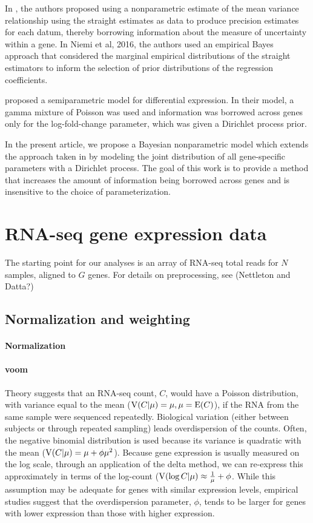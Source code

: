 In \citet{voom}, the authors proposed using a nonparametric estimate of the mean variance relationship using the straight estimates as data to produce precision estimates for each datum, thereby borrowing information about the measure of uncertainty within a gene. In Niemi et al, 2016, the authors used an empirical Bayes approach that considered the marginal empirical distributions of the straight estimators to inform the selection of prior distributions of the regression coefficients.

\citet{liu} proposed a semiparametric model for differential expression. In their model, a gamma mixture of Poisson was used and information was borrowed across genes only for the log-fold-change parameter, which was given a Dirichlet process prior.

In the present article, we propose a Bayesian nonparametric model which extends the approach taken in \citet{liu} by modeling the joint distribution of all gene-specific parameters with a Dirichlet process. The goal of this work is to provide a method that increases the amount of information being borrowed across genes and is insensitive to the choice of parameterization.


\section{RNA-seq gene expression data}
\label{sec:data}
The starting point for our analyses is an array of RNA-seq total reads for $N$ samples, aligned to $G$ genes. For details on preprocessing, see (Nettleton and Datta?) 

\subsection{Normalization and weighting}
\paragraph{Normalization}


\paragraph{voom}
Theory suggests that an RNA-seq count, $C$, would have a Poisson distribution, with variance equal to the mean ($\operatorname{V}(C|\mu)=\mu, \mu=\operatorname{E}(C)$), if the RNA from the same sample were sequenced repeatedly. Biological variation (either between subjects or through repeated sampling) leads overdispersion of the counts. Often, the negative binomial distribution is used because its variance is quadratic with the mean ($\operatorname{V}(C|\mu)=\mu+\phi\mu^2$). Because gene expression is usually measured on the log scale, through an application of the delta method, we can re-express this approximately in terms of the log-count ($\operatorname{V}(\log C|\mu) \approx \frac{1}{\mu} + \phi$. While this assumption may be adequate for genes with similar expression levels, empirical studies suggest that the overdispersion parameter, $\phi$, tends to be larger for genes with lower expression than those with higher expression.

